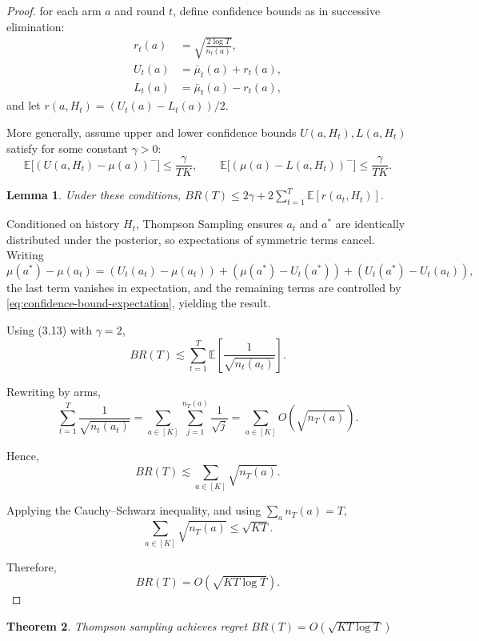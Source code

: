 \documentclass[12pt]{article}
\newtheorem{theorem}{Theorem}[section]
\newtheorem{lemma}[theorem]{Lemma}
\begin{document}
\begin{proof}
for each arm $a$ and round $t$, define confidence bounds as in successive elimination:
\begin{equation}
\begin{aligned}
r_t(a) &= \sqrt{\frac{2\log T}{n_t(a)}}, \\
U_t(a) &= \bar{\mu}_t(a) + r_t(a), \\
L_t(a) &= \bar{\mu}_t(a) - r_t(a),
\end{aligned}
\label{ts-conf-bounds}
\tag{3.8}
\end{equation}
and let $r(a,H_t) = (U_t(a)-L_t(a))/2$.

\noindent More generally, assume upper and lower confidence bounds $U(a,H_t), L(a,H_t)$ satisfy for some constant $\gamma > 0$:
\[
\mathbb{E}\big[(U(a,H_t)-\mu(a))^{-}\big] \le \frac{\gamma}{TK}, 
\qquad
\mathbb{E}\big[(\mu(a)-L(a,H_t))^{-}\big] \le \frac{\gamma}{TK}.
\label{eq:confidence-bound-expectation}
\tag{3.9–3.10}
\]

\begin{lemma}
Under these conditions, $BR(T) \le 2\gamma + 2\sum_{t=1}^T \mathbb{E}[r(a_t,H_t)].$
\end{lemma}


Conditioned on history $H_t$, Thompson Sampling ensures $a_t$ and $a^*$ are identically distributed under the posterior, so expectations of symmetric terms cancel. Writing
\[
\mu(a^*)-\mu(a_t)
= (U_t(a_t)-\mu(a_t)) + (\mu(a^*)-U_t(a^*)) + (U_t(a^*)-U_t(a_t)),
\]
the last term vanishes in expectation, and the remaining terms are controlled by \ref{eq:confidence-bound-expectation}, yielding the result.


Using (3.13) with $\gamma=2$,
\[
BR(T) \lesssim \sum_{t=1}^T \mathbb{E}\!\left[\frac{1}{\sqrt{n_t(a_t)}}\right].
\]

Rewriting by arms,
\[
\sum_{t=1}^T \frac{1}{\sqrt{n_t(a_t)}}
=
\sum_{a \in [K]} \sum_{j=1}^{n_T(a)} \frac{1}{\sqrt{j}}
=
\sum_{a \in [K]} O(\sqrt{n_T(a)}).
\]

Hence,
\[
BR(T) \lesssim \sum_{a \in [K]} \sqrt{n_T(a)}.
\]

Applying the Cauchy–Schwarz inequality, and using $\sum_a n_T(a)=T$,
\[
\sum_{a \in [K]} \sqrt{n_T(a)} \le \sqrt{KT}.
\]

Therefore,
\[
BR(T)=O\!\left(\sqrt{KT\log T}\right).
\]
\end{proof}

\begin{theorem}
Thompson sampling achieves regret $BR(T)=O\!\left(\sqrt{KT\log T}\right)$
\end{theorem}
\newpage
\end{document}
